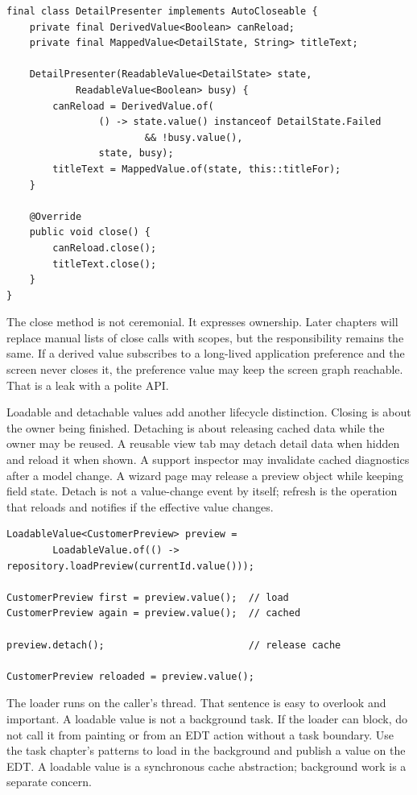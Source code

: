 \begin{lstlisting}[caption={A presenter owns the derived values it creates.}]
final class DetailPresenter implements AutoCloseable {
    private final DerivedValue<Boolean> canReload;
    private final MappedValue<DetailState, String> titleText;

    DetailPresenter(ReadableValue<DetailState> state,
            ReadableValue<Boolean> busy) {
        canReload = DerivedValue.of(
                () -> state.value() instanceof DetailState.Failed
                        && !busy.value(),
                state, busy);
        titleText = MappedValue.of(state, this::titleFor);
    }

    @Override
    public void close() {
        canReload.close();
        titleText.close();
    }
}
\end{lstlisting}

The close method is not ceremonial. It expresses ownership. Later chapters will
replace manual lists of close calls with scopes, but the responsibility remains
the same. If a derived value subscribes to a long-lived application preference
and the screen never closes it, the preference value may keep the screen graph
reachable. That is a leak with a polite API.

Loadable and detachable values add another lifecycle distinction. Closing is
about the owner being finished. Detaching is about releasing cached data while
the owner may be reused. A reusable view tab may detach detail data when hidden
and reload it when shown. A support inspector may invalidate cached diagnostics
after a model change. A wizard page may release a preview object while keeping
field state. Detach is not a value-change event by itself; refresh is the
operation that reloads and notifies if the effective value changes.

\begin{lstlisting}[caption={Detach releases cached data without pretending to edit it.}]
LoadableValue<CustomerPreview> preview =
        LoadableValue.of(() -> repository.loadPreview(currentId.value()));

CustomerPreview first = preview.value();  // load
CustomerPreview again = preview.value();  // cached

preview.detach();                         // release cache

CustomerPreview reloaded = preview.value();
\end{lstlisting}

The loader runs on the caller's thread. That sentence is easy to overlook and
important. A loadable value is not a background task. If the loader can block,
do not call it from painting or from an EDT action without a task boundary. Use
the task chapter's patterns to load in the background and publish a value on the
EDT. A loadable value is a synchronous cache abstraction; background work is a
separate concern.

